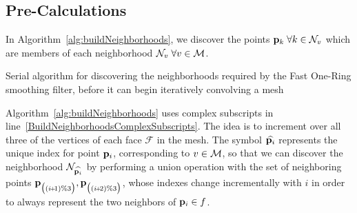 \subsection{Pre-Calculations}
In Algorithm~\ref{alg:buildNeighborhoods}, we discover the points $\mathbf{p}_k \; \forall k \in \mathcal{N}_v$ which are members of each neighborhood $\mathcal{N}_v \; \forall v \in \mathcal{M}$.
\begin{algorithm}
	\DontPrintSemicolon


	\bigskip
	\;
\nl	{}
	\caption{Serial algorithm for discovering the neighborhoods required by the Fast One-Ring smoothing filter, before it can begin iteratively convolving a mesh\label{alg:buildNeighborhoods}}
\end{algorithm}%
%
%

Algorithm~\ref{alg:buildNeighborhoods} uses complex subscripts in line~\ref{BuildNeighborhoodsComplexSubscripts}. The idea is to increment over all three of the vertices of each face $\mathcal{F}$ in the mesh. The symbol $\widehat{\mathbf{p}_i}$ represents the unique index for point $\mathbf{p}_i$, corresponding to $v \in \mathcal{M}$, so that we can discover the neighborhood $\mathcal{N}_{\widehat{\mathbf{p}_i}}$ by performing a union operation with the set of neighboring points $\bp_{\big((\sipo)\%3\big)}, \bp_{\big((\sipt)\%3\big)}$, whose indexes change incrementally with $i$ in order to always represent the two neighbors of $\mathbf{p}_i \in f$.

